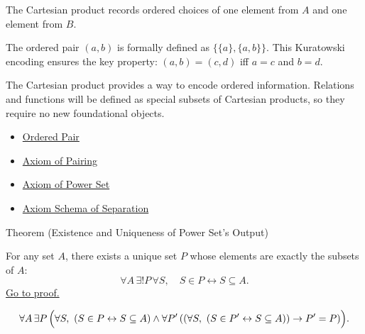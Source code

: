 \begin{remark*}[Interpretation]
The Cartesian product records ordered choices of one element from $A$ and one
element from $B$.
\end{remark*}

\begin{remark*}[Exposition]
The ordered pair $(a,b)$ is formally defined as $\{\{a\},\{a,b\}\}$.
This Kuratowski encoding ensures the key property: $(a,b) = (c,d)$ iff
$a = c$ and $b = d$.
\end{remark*}

\begin{remark*}[Exposition]
The Cartesian product provides a way to encode ordered information. Relations
and functions will be defined as special subsets of Cartesian products, so they
require no new foundational objects.
\end{remark*}

\begin{dependencies}
\begin{itemize}
  \item \hyperref[def:ordered-pair]{Ordered Pair}
  \item \hyperref[ax:pairing]{Axiom of Pairing}
  \item \hyperref[ax:power-set]{Axiom of Power Set}
  \item \hyperref[ax:separation]{Axiom Schema of Separation}
\end{itemize}
\end{dependencies}

\begin{theorembox}{Theorem (Existence and Uniqueness of Power Set's Output)}
\begin{theorem}\label{thm:power-set-output-exists-unique}
For any set $A$, there exists a unique set $P$ whose elements are exactly the
subsets of $A$:
\[
  \forall A\,\exists! P\,\forall S,\quad
  S\in P\leftrightarrow S\subseteq A.
\]
\hyperref[prf:power-set-output-exists-unique]{Go to proof.}
\end{theorem}
\end{theorembox}



\begin{remark*}
\[
  \forall A\,\exists P\,
  \Bigl(
  \forall S,\ (S\in P\leftrightarrow S\subseteq A)
  \wedge
  \forall P'\,((\forall S,\ (S\in P'\leftrightarrow S\subseteq A))\to P'=P)
  \Bigr).
\]
\end{remark*}

